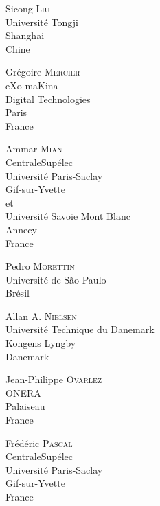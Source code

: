 \documentclass[main.tex]{subfiles}
\begin{document}
\begin{multicols}{2}
\begin{flushleft}
Sicong \textsc{Liu}\\Universit\'e Tongji\\Shanghai\\Chine
\end{flushleft}

\begin{flushleft}
Gr\'egoire \textsc{Mercier}\\eXo maKina\\Digital Technologies\\Paris\\France
\end{flushleft}

\begin{flushleft}
Ammar \textsc{Mian}\\CentraleSup\'{e}lec\\Universit\'e Paris-Saclay\\Gif-sur-Yvette \\et\\Universit\'e Savoie Mont Blanc\\Annecy\\France
\end{flushleft}

\begin{flushleft}
Pedro \textsc{Morettin}\\Universit\'e de S\~{a}o Paulo\\Brésil
\end{flushleft}

\begin{flushleft}
Allan A. \textsc{Nielsen}\\
Universit\'e Technique du Danemark\\
Kongens Lyngby\\
Danemark\\ 
\end{flushleft}\vspace*{50pt}\columnbreak

\begin{flushleft}
Jean-Philippe \textsc{Ovarlez}\\ONERA\\Palaiseau\\France
\end{flushleft}

\begin{flushleft}
Fr\'ed\'eric \textsc{Pascal}\\CentraleSup\'{e}lec\\Universit\'e Paris-Saclay\\ Gif-sur-Yvette\\France
\end{flushleft}


\end{multicols}
\end{document}

